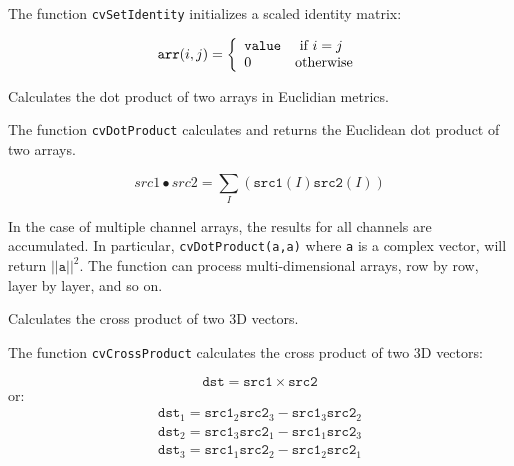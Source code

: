The function \texttt{cvSetIdentity} initializes a scaled identity matrix:

\[
\texttt{arr}(i,j)=\left\{ \begin{array}{l l} \texttt{value} & \mbox{ if $i=j$}\\ 0 & \mbox{otherwise}\\ \end{array} \right.
\]

\label{DotProduct}

Calculates the dot product of two arrays in Euclidian metrics.


\begin{description}
\end{description}

The function \texttt{cvDotProduct} calculates and returns the Euclidean dot product of two arrays.

\[
src1 \bullet src2 = \sum_I (\texttt{src1}(I) \texttt{src2}(I))
\]

In the case of multiple channel arrays, the results for all channels are accumulated. In particular, \texttt{cvDotProduct(a,a)} where \texttt{a} is a complex vector, will return $||\texttt{a}||^2$.
The function can process multi-dimensional arrays, row by row, layer by layer, and so on.

\label{CrossProduct}

Calculates the cross product of two 3D vectors.


\begin{description}
\end{description}


The function \texttt{cvCrossProduct} calculates the cross product of two 3D vectors:

\[ \texttt{dst} = \texttt{src1} \times \texttt{src2} \]
or:
\[
\begin{array}{l}
\texttt{dst}_1 = \texttt{src1}_2 \texttt{src2}_3 - \texttt{src1}_3 \texttt{src2}_2\\
\texttt{dst}_2 = \texttt{src1}_3 \texttt{src2}_1 - \texttt{src1}_1 \texttt{src2}_3\\
\texttt{dst}_3 = \texttt{src1}_1 \texttt{src2}_2 - \texttt{src1}_2 \texttt{src2}_1
\end{array}
\]

